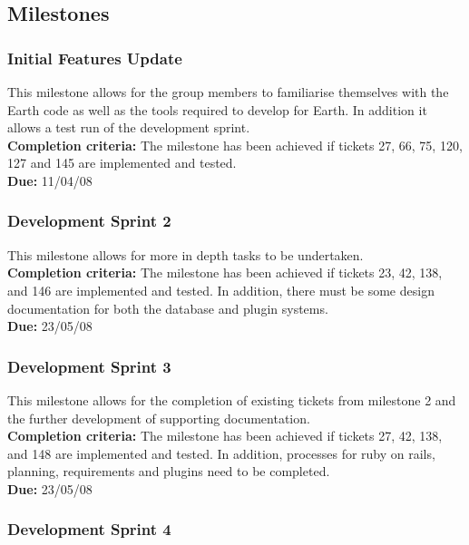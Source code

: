 \documentclass{article}
\begin{document}
\newpage{}

\subsection{Milestones}

\subsubsection{Initial Features Update}

This milestone allows for the group members to familiarise themselves with the Earth code as well as the tools required to develop for Earth. In addition it allows a test run of the development sprint.\\
\textbf{Completion criteria:} The milestone has been achieved if tickets 27, 66, 75, 120, 127 and 145 are implemented and tested.
\\
\textbf{Due:} 11/04/08

\subsubsection{Development Sprint 2}

This milestone allows for more in depth tasks to be undertaken. \\
\textbf{Completion criteria:} The milestone has been achieved if tickets 23, 42, 138, and 146 are implemented and tested. In addition, there must be some design documentation for both the database and plugin systems.
\\
\textbf{Due:} 23/05/08

\subsubsection{Development Sprint 3}

This milestone allows for the completion of existing tickets from milestone 2 and the further development of supporting documentation. \\
\textbf{Completion criteria:} The milestone has been achieved if tickets 27, 42, 138, and 148 are implemented and tested. In addition, processes for ruby on rails, planning, requirements and plugins need to be completed.
\\
\textbf{Due:} 23/05/08

\subsubsection{Development Sprint 4}
\end{document}
